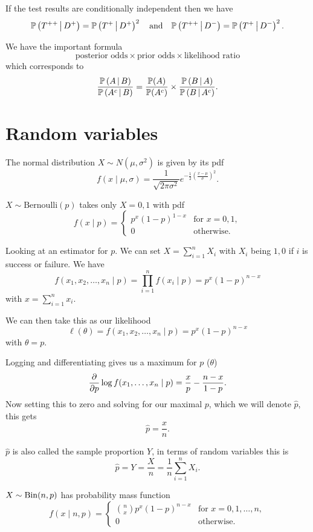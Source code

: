 \documentclass[10pt, a4paper]{article}
\begin{document}
If the test results are conditionally independent then we have
\[
\mathbb{P}\left(T ^ {++} \,\middle|\, D ^ {+}\right) = \mathbb{P}\left(T ^ {+} \,\middle|\, D ^ {+}\right) ^ 2\quad\text{and}\quad\mathbb{P}\left(T ^ {++} \,\middle|\, D ^ {-}\right) = \mathbb{P}\left(T ^ {+} \,\middle|\, D ^ {-}\right) ^ 2.
\]

We have the important formula
\[
\text{posterior odds} \times \text{prior odds} \times \text{likelihood ratio}
\]
which corresponds to
\[
\frac{\mathbb{P}\left(A \,\middle|\, B\right)}{\mathbb{P}\left(A ^ c \,\middle|\, B\right)} = \frac{\mathbb{P}(A)}{\mathbb{P}(A ^ c)}\times\frac{\mathbb{P}\left(B \,\middle|\, A\right)}{\mathbb{P}\left(B \,\middle|\, A ^ c\right)}.
\]

\newpage

\section{Random variables}
The normal distribution $X \sim N(\mu, \sigma ^ 2)$ is given by its pdf
\[
f(x\mid \mu, \sigma) = \frac{1}{\sqrt{2\pi\sigma ^ 2}}e ^ {-\frac{1}{2}\left(\frac{x - \mu}{\sigma}\right) ^ 2}.
\]

\begin{definition}
    $X \sim \mathrm{Bernoulli}(p)$ takes only $X = 0, 1$ with pdf
    \[
    f(x\mid p) = \begin{cases}
        p ^ x(1 - p) ^ {1 - x} &\text{for } x = 0, 1, \\
        0 & \text{otherwise}.
    \end{cases}
    \]
\end{definition}

Looking at an estimator for $p$.
We can set $X = \sum_{i = 1}^{n}X_i$ with $X_i$ being $1, 0$ if $i$ is success or failure.
We have
\[
f(x_1, x_2, \dotsc, x_n\mid p) = \prod_{i = 1}^{n}f(x_i\mid p) = p ^ x(1 - p) ^ {n - x}
\]
with $x = \sum_{i = 1}^{n}x_i$.

We can then take this as our likelihood
\[
\ell(\theta) = f(x_1, x_2, \dotsc, x_n\mid p) = p ^ x(1 - p) ^ {n - x}
\]
with $\theta = p$.

Logging and differentiating gives us a maximum for $p$
($\theta$)
\[
\frac{\partial }{\partial p}\log{f(x_1, \dotsc, x_n\mid p)} = \frac{x}{p} - \frac{n - x}{1 - p}.
\]
Now setting this to zero and solving for our maximal $p$,
which we will denote $\hat{p}$,
this gets
\[
\hat{p} = \frac{x}{n}.
\]

$\hat{p}$ is also called the sample proportion $Y$,
in terms of random variables this is
\[
\hat{p} = Y = \frac{X}{n} = \frac{1}{n}\sum_{i = 1}^{n}X_i.
\]

\begin{definition}
    $X \sim \operatorname{Bin}(n, p)$ has probability mass function
    \[
    f(x\mid n, p) = \begin{cases}
        \binom{n}{x}p ^ x(1 - p) ^ {n - x} &\text{for } x = 0, 1, \dotsc, n, \\
        0 &\text{otherwise}.
    \end{cases}
    \]
\end{definition}
\end{document}
